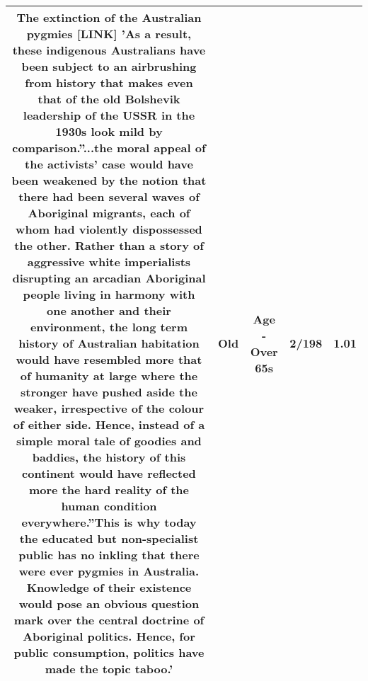 \documentclass[11pt]{article}
\newlength\mylength
\begin{document}
\begin{center}
\begin{longtable}{|C{.65\mylength}|C{.30\mylength}|C{.12\mylength}|C{.12\mylength}|C{.12\mylength}|}
  \small The extinction of the Australian pygmies [LINK] 'As a result, these indigenous Australians have been subject to an airbrushing from history that makes even that of the \textbf{old} Bolshevik leadership of the USSR in the 1930s look mild by comparison.''...the moral appeal of the activists' case would have been weakened by the notion that there had been several waves of Aboriginal migrants, each of whom had violently dispossessed the other. Rather than a story of aggressive white imperialists disrupting an arcadian Aboriginal people living in harmony with one another and their environment, the long term history of Australian habitation would have resembled more that of humanity at large where the stronger have pushed aside the weaker, irrespective of the colour of either side. Hence, instead of a simple moral tale of goodies and baddies, the history of this continent would have reflected more the hard reality of the human condition everywhere.''This is why today the educated but non-specialist public has no inkling that there were ever pygmies in Australia. Knowledge of their existence would pose an obvious question mark over the central doctrine of Aboriginal politics. Hence, for public consumption, politics have made the topic taboo.'\normalsize   & Old & Age - Over 65s & 2/198 & 1.01 \\  \hline

\end{longtable}
\end{center}
\end{document}
